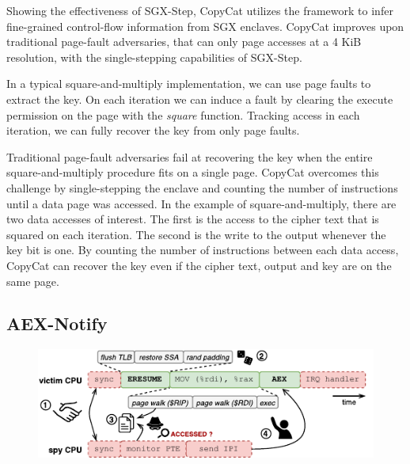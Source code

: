 \documentclass{llncs}
\begin{document}
Showing the effectiveness of SGX-Step,
CopyCat \cite{MoghimiBHPS20} utilizes the framework
to infer fine-grained control-flow information from SGX enclaves.
CopyCat improves upon traditional page-fault adversaries,
that can only page accesses at a 4 KiB resolution,
with the single-stepping capabilities of SGX-Step.

In a typical square-and-multiply implementation,
we can use page faults to extract the key.
On each iteration we can induce a fault by clearing the execute permission on
the page with the \emph{square} function.
Tracking access in each iteration, we can fully recover the key from only page faults.

Traditional page-fault adversaries fail at recovering the key when the entire
square-and-multiply procedure fits on a single page.
CopyCat overcomes this challenge by single-stepping the enclave and counting the
number of instructions until a data page was accessed.
In the example of square-and-multiply, there are two data accesses of interest.
The first is the access to the cipher text that is squared on each iteration.
The second is the write to the output whenever the key bit is one.
By counting the number of instructions between each data access,
CopyCat can recover the key even if the cipher text, output and key are on the same page.


\subsection{AEX-Notify}
\label{sec:aex-notify}

\begin{figure}[t]
  \centering
  \includegraphics{images/sgx-step-pte.pdf}
  \caption{}
  \label{fig:sgx-step-pte}
\end{figure}
\end{document}
